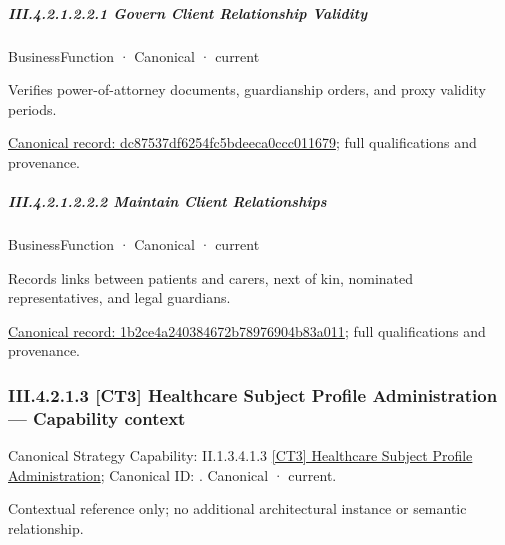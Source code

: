 \subparagraph*{III.4.2.1.2.2.1 Govern Client Relationship Validity}
\label{navigation:III.4.2.1.2.2.1}

\label{element:dc87537df6254fc5bdeeca0ccc011679}
{\small BusinessFunction · Canonical · current}\par

Verifies power-of-attorney documents, guardianship orders, and proxy validity periods.


{\footnotesize \href{../../../../continuum/business/business-function/dc87537df6254fc5bdeeca0ccc011679.md}{Canonical record: dc87537df6254fc5bdeeca0ccc011679}; full qualifications and provenance.}\par
\subparagraph*{III.4.2.1.2.2.2 Maintain Client Relationships}
\label{navigation:III.4.2.1.2.2.2}

\label{element:1b2ce4a240384672b78976904b83a011}
{\small BusinessFunction · Canonical · current}\par

Records links between patients and carers, next of kin, nominated representatives, and legal guardians.


{\footnotesize \href{../../../../continuum/business/business-function/1b2ce4a240384672b78976904b83a011.md}{Canonical record: 1b2ce4a240384672b78976904b83a011}; full qualifications and provenance.}\par
\subsubsection*{III.4.2.1.3 [CT3] Healthcare Subject Profile Administration — Capability context}
\label{navigation:III.4.2.1.3}

{\small Canonical Strategy Capability: II.1.3.4.1.3 \hyperref[element:df214b5499694b768eb4a7a175a9d471]{[CT3] Healthcare Subject Profile Administration}; Canonical ID: \texttt{}. Canonical · current.}\par
Contextual reference only; no additional architectural instance or semantic relationship.\par
